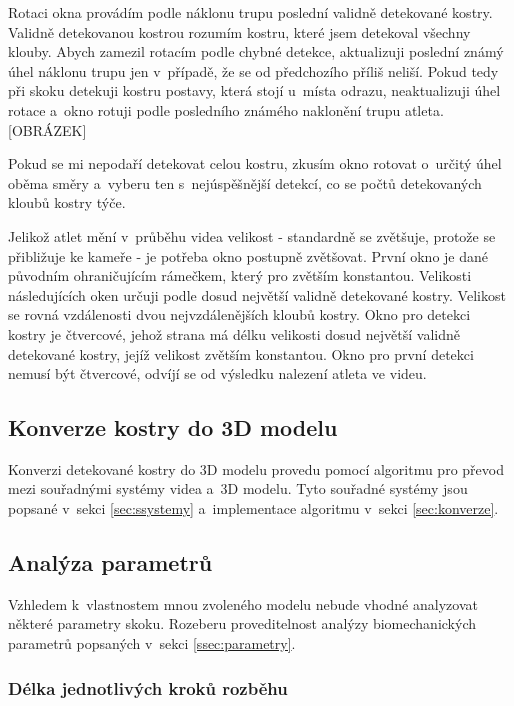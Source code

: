 Rotaci okna provádím podle náklonu trupu poslední validně detekované kostry. Validně detekovanou kostrou rozumím kostru, které jsem detekoval všechny klouby. Abych zamezil rotacím podle chybné detekce, aktualizuji poslední známý úhel náklonu trupu jen v~případě, že se od předchozího příliš neliší. Pokud tedy při skoku detekuji kostru postavy, která stojí u~místa odrazu, neaktualizuji úhel rotace a~okno rotuji podle posledního známého naklonění trupu atleta. [OBRÁZEK]

Pokud se mi nepodaří detekovat celou kostru, zkusím okno rotovat o~určitý úhel oběma směry a~vyberu ten s~nejúspěšnější detekcí, co se počtů detekovaných kloubů kostry týče.

Jelikož atlet mění v~průběhu videa velikost - standardně se zvětšuje, protože se přibližuje ke kameře - je potřeba okno postupně zvětšovat. První okno je dané původním ohraničujícím rámečkem, který pro zvětším konstantou. Velikosti následujících oken určuji podle dosud největší validně detekované kostry. Velikost se rovná vzdálenosti dvou nejvzdálenějších kloubů kostry. Okno pro detekci kostry je čtvercové, jehož strana má délku velikosti dosud největší validně detekované kostry, jejíž velikost zvětším konstantou. Okno pro první detekci nemusí být čtvercové, odvíjí se od výsledku nalezení atleta ve videu.



\subsection{Konverze kostry do 3D modelu}

Konverzi detekované kostry do 3D modelu provedu pomocí algoritmu pro převod mezi souřadnými systémy videa a~3D modelu. Tyto souřadné systémy jsou popsané v~sekci \ref{sec:ssystemy} a~implementace algoritmu v~sekci \ref{sec:konverze}.



\subsection{Analýza parametrů}

Vzhledem k~vlastnostem mnou zvoleného modelu nebude vhodné analyzovat některé parametry skoku. Rozeberu proveditelnost analýzy biomechanických parametrů popsaných v~sekci \ref{ssec:parametry}.


\subsubsection{Délka jednotlivých kroků rozběhu}

